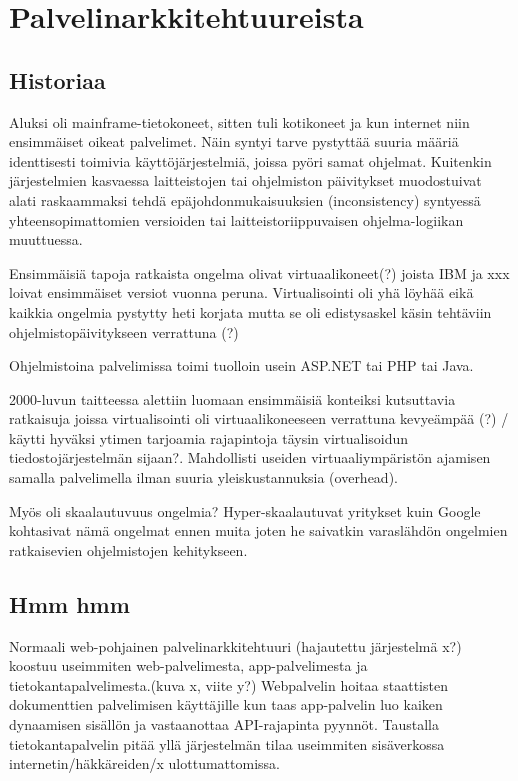 \documentclass[finnish]{tktltiki2}
\theoremstyle{definition}
\theoremstyle{remark}
\begin{document}
\section{Palvelinarkkitehtuureista}
\label{section:tokatk}

\subsection{Historiaa}

Aluksi oli mainframe-tietokoneet, sitten tuli kotikoneet ja kun internet niin ensimmäiset oikeat palvelimet. Näin syntyi tarve pystyttää suuria määriä identtisesti toimivia käyttöjärjestelmiä, joissa pyöri samat ohjelmat. Kuitenkin järjestelmien kasvaessa laitteistojen tai ohjelmiston päivitykset muodostuivat alati raskaammaksi tehdä epäjohdonmukaisuuksien (inconsistency) syntyessä yhteensopimattomien versioiden tai laitteistoriippuvaisen ohjelma-logiikan muuttuessa.

Ensimmäisiä tapoja ratkaista ongelma olivat virtuaalikoneet(?) joista IBM ja xxx loivat ensimmäiset versiot vuonna peruna. Virtualisointi oli yhä löyhää eikä kaikkia ongelmia pystytty heti korjata mutta se oli edistysaskel käsin tehtäviin ohjelmistopäivitykseen verrattuna (?)

Ohjelmistoina palvelimissa toimi tuolloin usein ASP.NET tai PHP tai Java.

2000-luvun taitteessa alettiin luomaan ensimmäisiä konteiksi kutsuttavia ratkaisuja joissa virtualisointi oli virtuaalikoneeseen verrattuna kevyeämpää (?) / käytti hyväksi ytimen tarjoamia rajapintoja täysin virtualisoidun tiedostojärjestelmän sijaan?. Mahdollisti useiden virtuaaliympäristön ajamisen samalla palvelimella ilman suuria yleiskustannuksia (overhead).

Myös oli skaalautuvuus ongelmia? Hyper-skaalautuvat yritykset kuin Google kohtasivat nämä ongelmat ennen muita joten he saivatkin varaslähdön ongelmien ratkaisevien ohjelmistojen kehitykseen.

\subsection{Hmm hmm}

Normaali web-pohjainen palvelinarkkitehtuuri (hajautettu järjestelmä x?) koostuu useimmiten web-palvelimesta, app-palvelimesta ja tietokantapalvelimesta.(kuva x, viite y?) Webpalvelin hoitaa staattisten dokumenttien palvelimisen käyttäjille kun taas app-palvelin luo kaiken dynaamisen sisällön ja vastaanottaa API-rajapinta pyynnöt. Taustalla tietokantapalvelin pitää yllä järjestelmän tilaa useimmiten sisäverkossa internetin/häkkäreiden/x ulottumattomissa.
\end{document}
